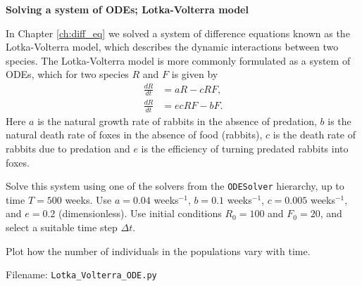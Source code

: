 \begin{Problem}{\textbf{Solving a system of ODEs; Lotka-Volterra model}}

  
  In Chapter \ref{ch:diff_eq} we solved a system of difference equations known
  as the Lotka-Volterra model, which describes the dynamic interactions between two
  species. The Lotka-Volterra model is more commonly formulated as a system of ODEs,
  which for two species $R$ and $F$ is given by
  \begin{align*}
  \frac{dR}{dt} &= aR - cRF, \\
  \frac{dR}{dt} &= ecRF - bF.
  \end{align*}
  Here $a$ is the natural growth rate of rabbits in the absence of predation, $b$ is
  the natural death rate of foxes in the absence of food (rabbits), $c$ is the death
  rate of rabbits due to predation and $e$ is the efficiency of turning
  predated rabbits into foxes.

  Solve this system using one of the solvers from the \texttt{ODESolver} hierarchy,
  up to time $T=500$ weeks. Use $a = 0.04$ weeks$^{-1}$, $b = 0.1$ weeks$^{-1}$,
  $c = 0.005$ weeks$^{-1}$, and $e = 0.2$ (dimensionless). Use initial conditions
  $R_0 = 100$ and $F_0 = 20$, and select a suitable time step $\Delta t$.

  Plot how the number of individuals in the populations
  vary with time.

Filename: \texttt{Lotka\_Volterra\_ODE.py}
\end{Problem}

